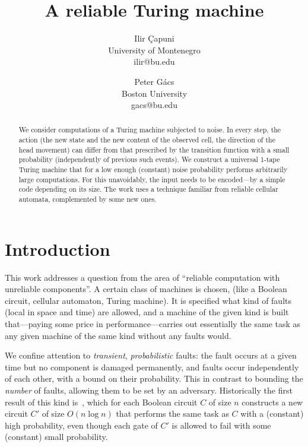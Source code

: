 \documentclass[11pt]{memoir}
\theoremstyle{definition} %
\begin{document}
\title{A reliable Turing machine}

\author{Ilir \c{C}apuni 
\\ University of Montenegro
\\ ilir@bu.edu
\and
Peter G\'acs
\\ Boston University
\\ gacs@bu.edu
}
\maketitle

\begin{abstract}
  We consider computations of a Turing machine subjected to noise.
  In every step, the action (the new state and the new content of the observed
  cell, the direction of the head movement) can differ from that prescribed by
  the transition function with a small probability (independently of previous
  such events).  We construct a universal 1-tape Turing machine that for a low enough
  (constant) noise probability performs arbitrarily large computations.  For
  this unavoidably, the input needs to be encoded---by a simple code depending
  on its size.  The work uses a technique familiar from reliable cellular
  automata, complemented by some new ones.
\end{abstract}

\newpage


\section{Introduction}

This work addresses a question from the area of ``reliable computation with unreliable components''.
A certain class of machines is chosen, (like a Boolean circuit, cellular automaton, Turing machine).
It is specified what kind of faults (local in space and time)
are allowed, and a machine of the given
kind is built that---paying some price in performance---carries out essentially the same
task as any given machine of the same kind without any faults would.

We confine attention to \emph{transient}, \emph{probabilistic} faults:
the fault occurs at a given time but no component is damaged permanently,
and faults occur independently of each other, with a bound on their probability.
This in contrast to bounding the \emph{number} of faults, allowing them to be set by an adversary.
Historically the first result of this kind is~\cite{VonNeum56}, which for each Boolean
circuit \( C \) of size \( n \) constructs a new circuit \( C' \)
of size \( O(n\log n) \) that performs the same task as \( C \) with a (constant)
high probability, even though each gate of
\( C' \) is allowed to fail with some (constant) small probability.
\end{document}
